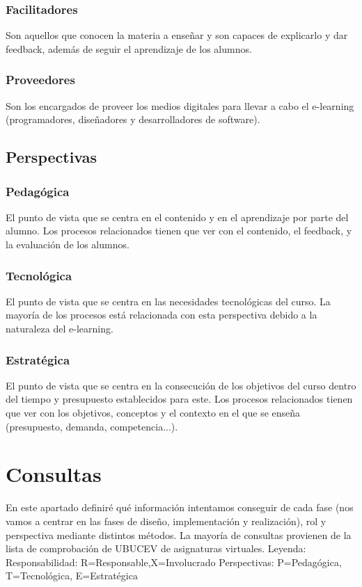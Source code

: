 \subsubsection{Facilitadores}
Son aquellos que conocen la materia a enseñar y son capaces de explicarlo y dar feedback, además de seguir el aprendizaje de los alumnos.

\subsubsection{Proveedores}
Son los encargados de proveer los medios digitales para llevar a cabo el e-learning (programadores, diseñadores y desarrolladores de software).

\subsection{Perspectivas}

\subsubsection{Pedagógica}
El punto de vista que se centra en el contenido y en el aprendizaje por parte del alumno. Los procesos relacionados tienen que ver con el contenido, el feedback, y la evaluación de los alumnos.

\subsubsection{Tecnológica}
El punto de vista que se centra en las necesidades tecnológicas del curso. La mayoría de los procesos está relacionada con esta perspectiva debido a la naturaleza del e-learning.

\subsubsection{Estratégica}
El punto de vista que se centra en la consecución de los objetivos del curso dentro del tiempo y presupuesto establecidos para este. Los procesos relacionados tienen que ver con los objetivos, conceptos y el contexto en el que se enseña (presupuesto, demanda, competencia...).


\section{Consultas}
En este apartado definiré qué información intentamos conseguir de cada fase (nos vamos a centrar en las fases de diseño, implementación y realización), rol y perspectiva mediante distintos métodos. La mayoría de consultas provienen de la lista de comprobación de UBUCEV de asignaturas virtuales.
Leyenda:
Responsabilidad: R=Responsable,X=Involucrado
Perspectivas: P=Pedagógica, T=Tecnológica, E=Estratégica

